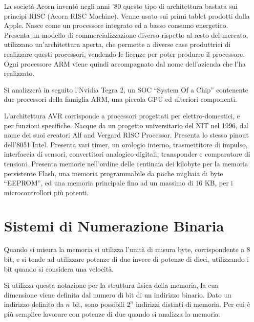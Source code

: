 \documentclass{article}
\numberwithin{equation}{subsection}
\begin{document}
La società Acorn inventò negli anni '80 questo tipo di architettura bastata sui principi RISC (Acorn RISC Machine). Venne usato sui primi tablet prodotti dalla Apple. Nasce come 
un processore integrato ed a basso consumo energetico. Presenta un modello di commercializzazione diverso rispetto al resto del mercato, utilizzano un'architettura aperta, che 
permette a diverse case produttrici di realizzare questi processori, vendendo le licenze per poter produrre il processore. Ogni processore ARM viene quindi accompagnato dal nome 
dell'azienda che l'ha realizzato. 

Si analizzerà in seguito l'Nvidia Tegra 2, un SOC ``System Of a Chip'' contenente due processori della famiglia ARM, una piccola GPU ed ulteriori componenti.  

L'architettura AVR corrisponde a processori progettati per elettro-domestici, e per funzioni specifiche. Nacque da un progetto universitario del NIT nel 1996, dal nome dei 
suoi creatori Alf and Vergard RISC Processor. Presenta lo stesso pinout dell'8051 Intel. Presenta vari timer, un orologio interno, trasmettitore di impulso, interfaccia 
di sensori, convertitori analogico-digitali, transponder e comparatore di tensioni. Presenta memorie nell'ordine delle centinaia dei kilobyte per la memoria persistente Flash, 
una memoria programmabile da poche migliaia di byte ``EEPROM'', ed una memoria principale fino ad un massimo di 16 KB, per i microcontrollori più potenti. 

\clearpage

\section{Sistemi di Numerazione Binaria}


Quando si misura la memoria si utilizza l'unità di misura byte, corrispondente a 8 bit, e si tende ad utilizzare potenze di due invece di potenze di dieci, utilizzando 
i bit quando si considera una velocità. 

Si utilizza questa notazione per la struttura fisica della memoria, la cua dimensione viene definita dal numero di bit di un indirizzo binario. Dato un indirizzo definito da 
$n$ bit, sono possibili $2^n$ indirizzi distinti di memoria. Per cui è più semplice lavorare con potenze di due quando si analizza la memoria. 
\end{document}
